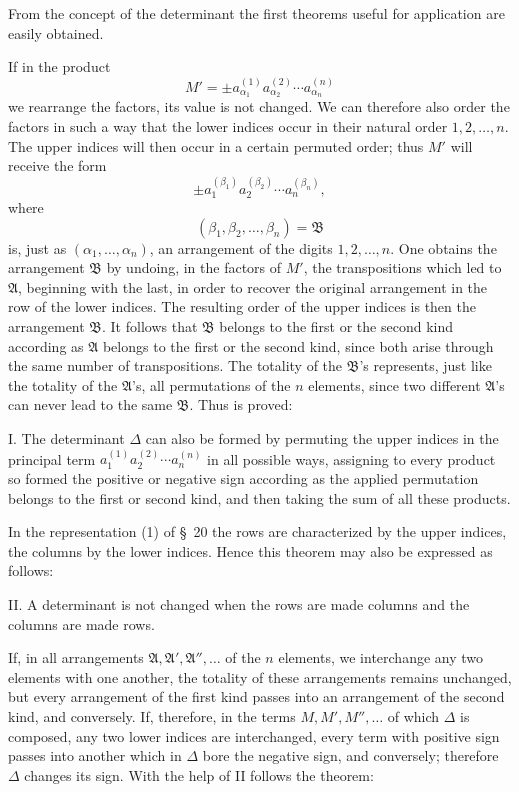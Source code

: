 \documentclass[11pt]{article}
\begin{document}
From the concept of the determinant the first theorems useful for application are easily obtained.

If in the product
\begin{equation}
 M'=\pm a_{\alpha_1}^{(1)}a_{\alpha_2}^{(2)}\cdots a_{\alpha_n}^{(n)}
\tag{1}
\end{equation}
we rearrange the factors, its value is not changed. We can therefore also order the factors in such a way that the lower indices occur in their natural order \(1,2,\ldots,n\). The upper indices will then occur in a certain permuted order; thus \(M'\) will receive the form
\begin{equation}
 \pm a_1^{(\beta_1)}a_2^{(\beta_2)}\cdots a_n^{(\beta_n)},
\tag{2}
\end{equation}
where
\[
 (\beta_1,\beta_2,\ldots,\beta_n)=\mathfrak B
\]
is, just as \((\alpha_1,\ldots,\alpha_n)\), an arrangement of the digits \(1,2,\ldots,n\). One obtains the arrangement \(\mathfrak B\) by undoing, in the factors of \(M'\), the transpositions which led to \(\mathfrak A\), beginning with the last, in order to recover the original arrangement in the row of the lower indices. The resulting order of the upper indices is then the arrangement \(\mathfrak B\). It follows that \(\mathfrak B\) belongs to the first or the second kind according as \(\mathfrak A\) belongs to the first or the second kind, since both arise through the same number of transpositions. The totality of the \(\mathfrak B\)'s represents, just like the totality of the \(\mathfrak A\)'s, all permutations of the \(n\) elements, since two different \(\mathfrak A\)'s can never lead to the same \(\mathfrak B\). Thus is proved:

I. The determinant \(\Delta\) can also be formed by permuting the upper indices in the principal term \(a_1^{(1)}a_2^{(2)}\cdots a_n^{(n)}\) in all possible ways, assigning to every product so formed the positive or negative sign according as the applied permutation belongs to the first or second kind, and then taking the sum of all these products.

In the representation (1) of \S~20 the rows are characterized by the upper indices, the columns by the lower indices. Hence this theorem may also be expressed as follows:

II. A determinant is not changed when the rows are made columns and the columns are made rows.

If, in all arrangements \(\mathfrak A,\mathfrak A',\mathfrak A'',\ldots\) of the \(n\) elements, we interchange any two elements with one another, the totality of these arrangements remains unchanged, but every arrangement of the first kind passes into an arrangement of the second kind, and conversely. If, therefore, in the terms \(M,M',M'',\ldots\) of which \(\Delta\) is composed, any two lower indices are interchanged, every term with positive sign passes into another which in \(\Delta\) bore the negative sign, and conversely; therefore \(\Delta\) changes its sign. With the help of II follows the theorem:
\end{document}
